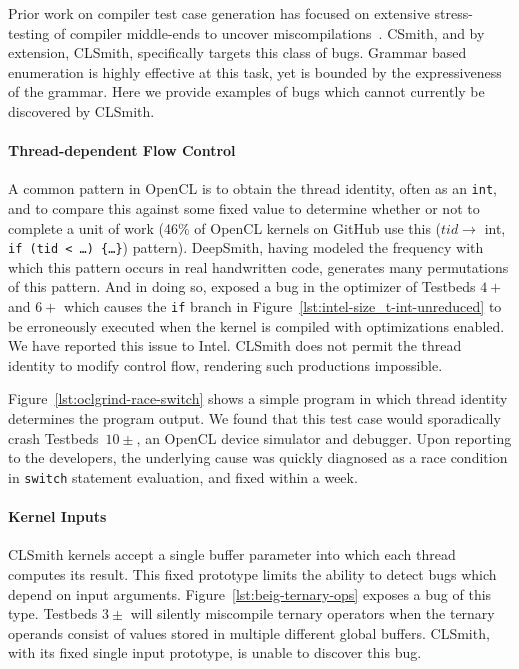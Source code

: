 Prior work on compiler test case generation has focused on extensive stress-
testing of compiler middle-ends to uncover miscompilations~\cite{Chen2014a}.
CSmith, and by extension, CLSmith, specifically targets this class of bugs.
Grammar based enumeration is highly effective at this task, yet is bounded by
the expressiveness of the grammar. Here we provide examples of bugs which cannot
currently be discovered by CLSmith.

\paragraph{Thread-dependent Flow Control}

A common pattern in OpenCL is to obtain the thread identity, often as an
\texttt{int}, and to compare this against some fixed value to determine whether
or not to complete a unit of work (46\% of OpenCL kernels on GitHub use this
($tid \rightarrow$ int, \texttt{if (tid < \ldots) \{\ldots\}}) pattern).
DeepSmith, having modeled the frequency with which this pattern occurs in real
handwritten code, generates many permutations of this pattern. And in doing so,
exposed a bug in the optimizer of Testbeds $4+$ and $6+$ which causes the
\texttt{if} branch in Figure~\ref{lst:intel-size_t-int-unreduced} to be
erroneously executed when the kernel is compiled with optimizations enabled. We
have reported this issue to Intel. CLSmith does not permit the thread identity
to modify control flow, rendering such productions impossible.

Figure~\ref{lst:oclgrind-race-switch} shows a simple program in which thread
identity determines the program output. We found that this test case would
sporadically crash Testbeds~$10\pm$, an OpenCL device simulator and debugger.
Upon reporting to the developers, the underlying cause was quickly diagnosed as
a race condition in \texttt{switch} statement evaluation, and fixed within a
week.

\paragraph{Kernel Inputs}

CLSmith kernels accept a single buffer parameter into which each thread computes
its result. This fixed prototype limits the ability to detect bugs which depend
on input arguments. Figure~\ref{lst:beig-ternary-ops} exposes a bug of this
type. Testbeds $3\pm$ will silently miscompile ternary operators when the
ternary operands consist of values stored in multiple different global buffers.
CLSmith, with its fixed single input prototype, is unable to discover this bug.

